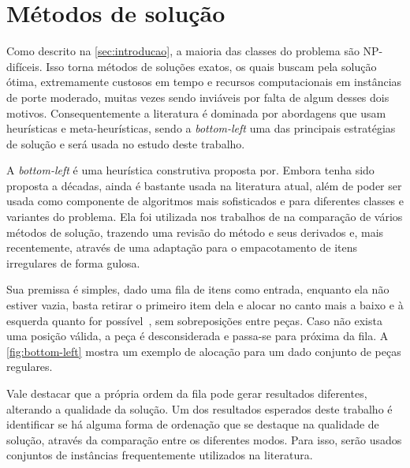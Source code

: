 \section{Métodos de solução}\label{sec:metodos-de-solucao}

Como descrito na \autoref{sec:introducao}, a maioria das classes do problema são NP-difíceis.
Isso torna métodos de soluções exatos, os quais buscam pela solução ótima, extremamente custosos
em tempo e recursos computacionais em instâncias de porte moderado, muitas vezes sendo inviáveis
por falta de algum desses dois motivos.
Consequentemente a literatura é dominada por abordagens que usam heurísticas e meta-heurísticas,
sendo a \textit{bottom-left} uma das principais estratégias de solução e será usada no estudo
deste trabalho.

A \textit{bottom-left} é uma heurística construtiva proposta por.
Embora tenha sido proposta a décadas, ainda é bastante usada na literatura atual, além de poder
ser usada como componente de algoritmos mais sofisticados e para diferentes classes e variantes
do problema.
Ela foi utilizada nos trabalhos de  na comparação de vários
métodos de solução,  trazendo uma revisão do método e seus derivados
e, mais recentemente,  através de uma adaptação para o
empacotamento de itens irregulares de forma gulosa.

Sua premissa é simples, dado uma fila de itens como entrada, enquanto ela não estiver vazia,
basta retirar o primeiro item dela e alocar no canto mais a baixo e à esquerda quanto for
possível~\cite{aprendizado-reforco}, sem sobreposições entre peças.
Caso não exista uma posição válida, a peça é desconsiderada e passa-se para próxima da fila.
A \autoref{fig:bottom-left} mostra um exemplo de alocação para um dado conjunto de peças regulares.



Vale destacar que a própria ordem da fila pode gerar resultados diferentes, alterando a qualidade
da solução.
Um dos resultados esperados deste trabalho é identificar se há alguma forma de ordenação que
se destaque na qualidade de solução, através da comparação entre os diferentes modos.
Para isso, serão usados conjuntos de instâncias frequentemente utilizados na literatura.



